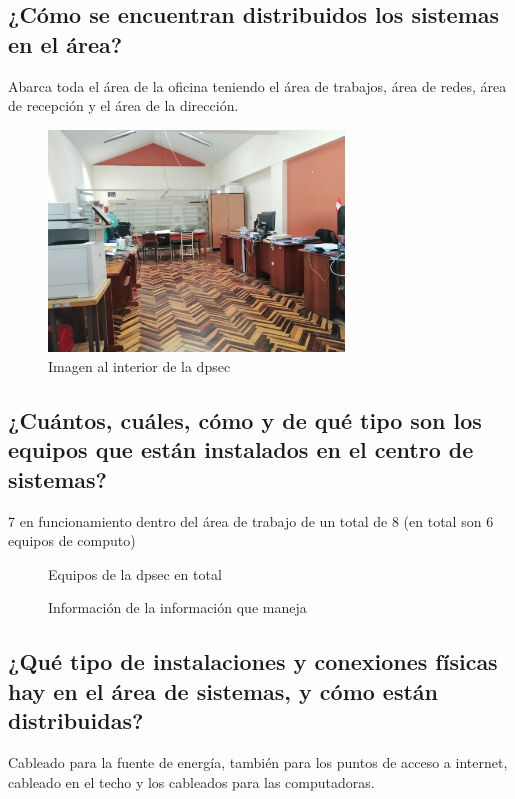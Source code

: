 \documentclass[12pt,a4paper]{article}
\begin{document}
\subsection*{¿Cómo se encuentran distribuidos los sistemas en el área?}
Abarca toda el área de la oficina teniendo el área de trabajos, área de redes, área de recepción y el área de la dirección.
\begin{figure}[!htb]
    \centering
    \includegraphics[width=0.7\textwidth]{images/AreaTrabajo.jpeg}
    \caption{Imagen al interior de la dpsec}

\end{figure}

\FloatBarrier

\subsection*{¿Cuántos, cuáles, cómo y de qué tipo son los equipos que están instalados
en el centro de sistemas?}
7 en funcionamiento dentro del área de trabajo de un total de 8 (en total son 6 equipos de computo)
\begin{figure}[!htb]
    \centering
    \caption{Equipos de la dpsec en total}
\end{figure}
\FloatBarrier
\begin{figure}[!htb]
    \centering
    \caption{Información de la información que maneja}
\end{figure}
\FloatBarrier

\subsection*{¿Qué tipo de instalaciones y conexiones físicas hay en el área de sistemas, y
cómo están distribuidas?}
Cableado  para la fuente de energía, también para los puntos de acceso a internet, cableado en el techo y los cableados para las computadoras.
\end{document}
